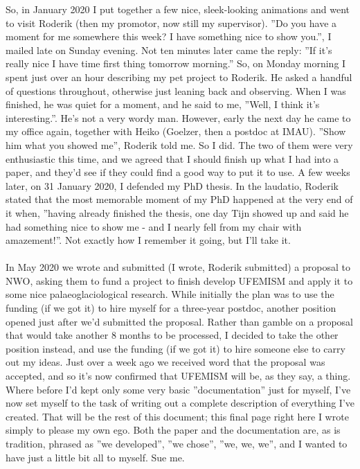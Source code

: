 \documentclass{article}
\begin{document}
So, in January 2020 I put together a few nice, sleek-looking animations and went to visit Roderik (then my promotor, now still my supervisor). ''Do you have a moment for me somewhere this week? I have something nice to show you.'', I mailed late on Sunday evening. Not ten minutes later came the reply: ''If it's really nice I have time first thing tomorrow morning.'' So, on Monday morning I spent just over an hour describing my pet project to Roderik. He asked a handful of questions throughout, otherwise just leaning back and observing. When I was finished, he was quiet for a moment, and he said to me, ''Well, I think it's interesting.''. He's not a very wordy man. However, early the next day he came to my office again, together with Heiko (Goelzer, then a postdoc at IMAU). ''Show him what you showed me'', Roderik told me. So I did. The two of them were very enthusiastic this time, and we agreed that I should finish up what I had into a paper, and they'd see if they could find a good way to put it to use. A few weeks later, on 31 January 2020, I defended my PhD thesis. In the laudatio, Roderik stated that the most memorable moment of my PhD happened at the very end of it when, ''having already finished the thesis, one day Tijn showed up and said he had something nice to show me - and I nearly fell from my chair with amazement!''. Not exactly how I remember it going, but I'll take it.\\
\\
In May 2020 we wrote and submitted (I wrote, Roderik submitted) a proposal to NWO, asking them to fund a project to finish develop UFEMISM and apply it to some nice palaeoglaciological research. While initially the plan was to use the funding (if we got it) to hire myself for a three-year postdoc, another position opened just after we'd submitted the proposal. Rather than gamble on a proposal that would take another 8 months to be processed, I decided to take the other position instead, and use the funding (if we got it) to hire someone else to carry out my ideas. Just over a week ago we received word that the proposal was accepted, and so it's now confirmed that UFEMISM will be, as they say, a thing. Where before I'd kept only some very basic ''documentation'' just for myself, I've now set myself to the task of writing out a complete description of everything I've created. That will be the rest of this document; this final page right here I wrote simply to please my own ego. Both the paper and the documentation are, as is tradition, phrased as ''we developed'', ''we chose'', ''we, we, we'', and I wanted to have just a little bit all to myself. Sue me.
\end{document}
